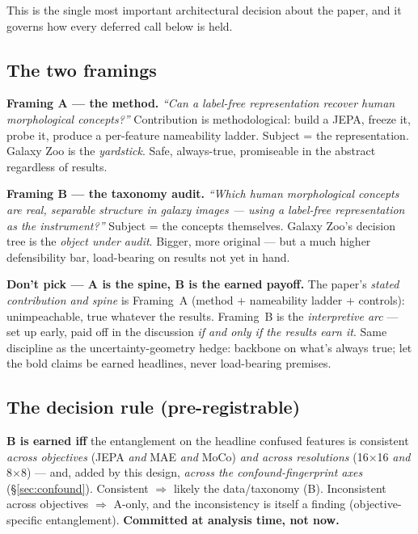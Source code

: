 \documentclass[11pt,a4paper]{article}
\begin{document}
This is the single most important architectural decision about the paper, and it governs how
every deferred call below is held.

\subsection{The two framings}

\textbf{Framing A --- the method.} \emph{``Can a label-free representation recover human
morphological concepts?''} Contribution is methodological: build a JEPA, freeze it, probe it,
produce a per-feature nameability ladder. Subject = the representation. Galaxy Zoo is the
\emph{yardstick}. Safe, always-true, promiseable in the abstract regardless of results.

\textbf{Framing B --- the taxonomy audit.} \emph{``Which human morphological concepts are real,
separable structure in galaxy images --- using a label-free representation as the
instrument?''} Subject = the concepts themselves. Galaxy Zoo's decision tree is the \emph{object
under audit}. Bigger, more original --- but a much higher defensibility bar, load-bearing on
results not yet in hand.

\begin{decidedbox}
\textbf{Don't pick --- A is the spine, B is the earned payoff.} The paper's \emph{stated
contribution and spine} is Framing~A (method + nameability ladder + controls): unimpeachable,
true whatever the results. Framing~B is the \emph{interpretive arc} --- set up early, paid off
in the discussion \emph{if and only if the results earn it}. Same discipline as the
uncertainty-geometry hedge: backbone on what's always true; let the bold claims be earned
headlines, never load-bearing premises.
\end{decidedbox}

\subsection{The decision rule (pre-registrable)}

\begin{deferredbox}
\textbf{B is earned iff} the entanglement on the headline confused features is consistent
\emph{across objectives} (JEPA \emph{and} MAE \emph{and} MoCo) \emph{and across resolutions}
(16$\times$16 \emph{and} 8$\times$8) --- and, added by this design, \emph{across the
confound-fingerprint axes} (\S\ref{sec:confound}). Consistent $\Rightarrow$ likely the
data/taxonomy (B). Inconsistent across objectives $\Rightarrow$ A-only, and the inconsistency
is itself a finding (objective-specific entanglement). \textbf{Committed at analysis time, not
now.}
\end{deferredbox}
\end{document}

